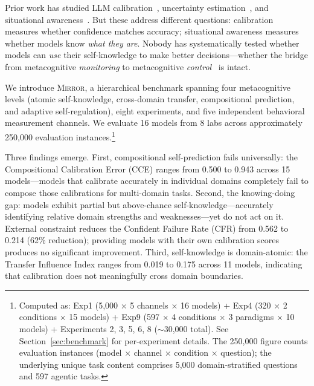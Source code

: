 \documentclass[10pt]{article}
\newcommand{\mirror}{\textsc{Mirror}}
\newcommand{\CCE}{CCE}
\newcommand{\CFR}{CFR}
\begin{document}
Prior work has studied LLM calibration~\citep{kadavath2022language,
kapoor2024calibration}, uncertainty estimation~\citep{lin2024generating}, and
situational awareness~\citep{laine2024me}. But these address different questions:
calibration measures whether confidence matches accuracy; situational awareness
measures whether models know \textit{what they are}. Nobody has systematically
tested whether models can \textit{use} their self-knowledge to make better
decisions---whether the bridge from metacognitive \textit{monitoring} to
metacognitive \textit{control}~\citep{nelson1990metamemory} is intact.

We introduce \mirror{}, a hierarchical benchmark spanning four metacognitive levels
(atomic self-knowledge, cross-domain transfer, compositional prediction, and
adaptive self-regulation), eight experiments, and five independent behavioral
measurement channels. We evaluate 16 models from 8 labs across approximately
250,000 evaluation instances.\footnote{Computed as: Exp1 (5,000 $\times$ 5 channels $\times$ 16 models) + Exp4 (320 $\times$ 2 conditions $\times$ 15 models) + Exp9 (597 $\times$ 4 conditions $\times$ 3 paradigms $\times$ 10 models) + Experiments 2, 3, 5, 6, 8 ($\sim$30,000 total). See Section~\ref{sec:benchmark} for per-experiment details. The 250,000 figure counts evaluation instances (model $\times$ channel $\times$ condition $\times$ question); the underlying unique task content comprises 5,000 domain-stratified questions and 597 agentic tasks.}

Three findings emerge. First, compositional self-prediction fails universally: the Compositional Calibration Error (\CCE{}) ranges from 0.500 to 0.943 across
15 models---models that calibrate accurately in individual domains completely fail to
compose those calibrations for multi-domain tasks. Second, the knowing-doing gap:
models exhibit partial but above-chance self-knowledge---accurately identifying
relative domain strengths and weaknesses---yet do not act on it. External constraint
reduces the Confident Failure Rate (\CFR{}) from 0.562 to 0.214 (62\% reduction);
providing models with their own calibration scores produces no significant
improvement. Third, self-knowledge is domain-atomic: the Transfer Influence Index
ranges from 0.019 to 0.175 across 11 models, indicating that calibration does not
meaningfully cross domain boundaries.
\end{document}
